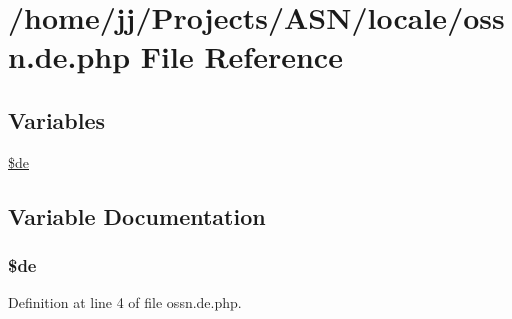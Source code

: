 \hypertarget{locale_2ossn_8de_8php}{}\section{/home/jj/\+Projects/\+A\+S\+N/locale/ossn.de.\+php File Reference}
\label{locale_2ossn_8de_8php}
\subsection*{Variables}
\begin{DoxyCompactItemize}
\item 
\hyperlink{locale_2ossn_8de_8php_aab7de7e51b4580005f63dd4cf5e17311}{\$de}
\end{DoxyCompactItemize}


\subsection{Variable Documentation}
\subsubsection[{\texorpdfstring{\$de}{$de}}]{\setlength{\rightskip}{0pt plus 5cm}\$de}\hypertarget{locale_2ossn_8de_8php_aab7de7e51b4580005f63dd4cf5e17311}{}\label{locale_2ossn_8de_8php_aab7de7e51b4580005f63dd4cf5e17311}


Definition at line 4 of file ossn.\+de.\+php.

